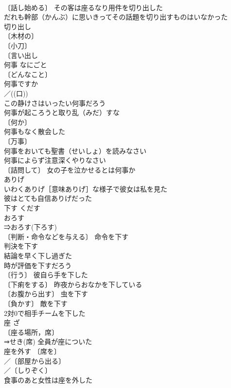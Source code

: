 \documentclass[8pt]{extreport}
\begin{document}
\begin{CJK}{UTF8}{min}
\\	〔話し始める〕 その客は座るなり用件を切り出した 
\\	だれも幹部（かんぶ）に思いきってその話題を切り出すものはいなかった 
\\	切り出し 
\\	〔木材の〕
\\	〔小刀〕
\\	〔言い出し 
\\	何事	なにごと	
\\	〔どんなこと〕
\\	何事ですか 
\\	／((口))
\\	この静けさはいったい何事だろう 
\\	何事が起ころうと取り乱（みだ）すな 
\\	〔何か〕
\\	何事もなく散会した 
\\	〔万事〕
\\	何事をおいても聖書（せいしょ）を読みなさい 
\\	何事によらず注意深くやりなさい 
\\	〔詰問して〕 女の子を泣かせるとは何事か 
\\	ありげ		
\\	いわくありげ［意味ありげ］な様子で彼女は私を見た 
\\	彼はとても自信ありげだった 
\\	下す	くだす	
\\	おろす 
\\	⇒おろす(下ろす) 
\\	〔判断・命令などを与える〕 命令を下す 
\\	判決を下す 
\\	結論を早く下し過ぎた 
\\	時が評価を下すだろう 
\\	〔行う〕 彼自ら手を下した 
\\	〔下痢をする〕 昨夜からおなかを下している 
\\	〔お腹から出す〕 虫を下す 
\\	〔負かす〕 敵を下す 
\\	2対0で相手チームを下した 
\\	座	ざ	
\\	〔座る場所，席〕
\\	⇒せき(席) 全員が座についた 
\\	座を外す 〔席を〕
\\	／〔部屋から出る〕
\\	／〔しりぞく〕
\\	食事のあと女性は座を外した 

\end{CJK}
\end{document}
